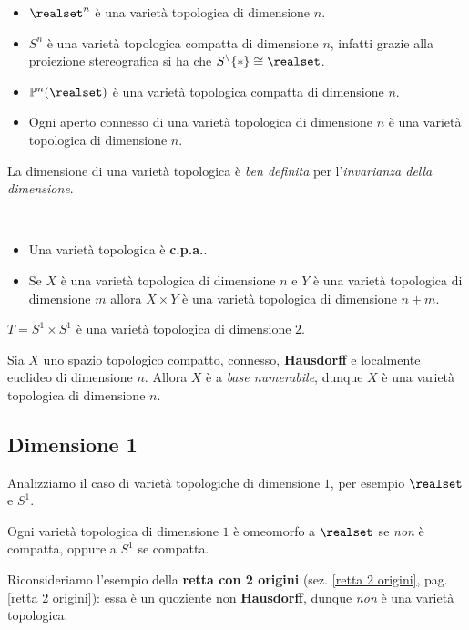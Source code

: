 \begin{examples}
	\begin{itemize}
		\item $\realset^n$ è una varietà topologica di dimensione $n$.
		\item $S^n$ è una varietà topologica compatta di dimensione $n$, infatti grazie alla proiezione stereografica si ha che $S^\setminus\{*\}\cong \realset$.
		\item $\mathbb{P}^n(\realset)$ è una varietà topologica compatta di dimensione $n$.
		\item Ogni aperto connesso di una varietà topologica di dimensione $n$ è una varietà topologica di dimensione $n$.
	\end{itemize}
\vspace{-3mm}
\end{examples}
\begin{observe}
	La dimensione di una varietà topologica è \textit{ben definita} per l'\textit{invarianza della dimensione}.
\end{observe}
\begin{observes}~{}
	\begin{itemize}
		\item Una varietà topologica è \textbf{c.p.a.}.
		\item Se $X$ è una varietà topologica di dimensione $n$ e $Y$ è una varietà topologica di dimensione $m$ allora $X\times Y$ è una varietà topologica di dimensione $n+m$.
	\end{itemize}
\end{observes}
\begin{example}
	$T=S^1\times S^1$ è una varietà topologica di dimensione $2$.
\end{example}

\begin{theorema}
	Sia $X$ uno spazio topologico compatto, connesso, \textbf{Hausdorff} e localmente euclideo di dimensione $n$. Allora $X$ è a \textit{base numerabile}, dunque $X$ è una varietà topologica di dimensione $n$.
\end{theorema}
 
\subsection{Dimensione 1}
Analizziamo il caso di varietà topologiche di dimensione $1$, per esempio $\realset$ e $S^1$.
\begin{theorema}
	Ogni varietà topologica di dimensione $1$ è omeomorfo a $\realset$ se \textit{non} è compatta, oppure a $S^1$ se compatta.
\end{theorema}
\begin{example} 
Riconsideriamo l'esempio della \textbf{retta con 2 origini} (sez. \ref{retta 2 origini}, pag. \ref{retta 2 origini}): essa è un quoziente non \textbf{Hausdorff}, dunque \textit{non} è una varietà topologica.
\end{example}
